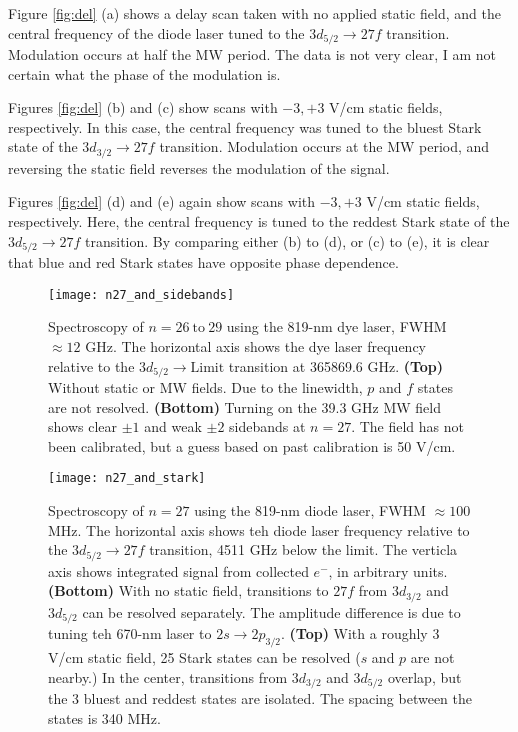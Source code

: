\documentclass{article}
\begin{document}
Figure \ref{fig:del} (a) shows a delay scan taken with no applied static field, and the central frequency of the diode laser tuned to the $3d_{5/2} \rightarrow 27f$ transition. Modulation occurs at half the MW period. The data is not very clear, I am not certain what the phase of the modulation is.

Figures \ref{fig:del} (b) and (c) show scans with $-3, +3$ V/cm static fields, respectively. In this case, the central frequency was tuned to the bluest Stark state of the $3d_{3/2} \rightarrow 27f$ transition. Modulation occurs at the MW period, and reversing the static field reverses the modulation of the signal.

Figures \ref{fig:del} (d) and (e) again show scans with $-3, +3$ V/cm static fields, respectively. Here, the central frequency is tuned to the reddest Stark state of the $3d_{5/2} \rightarrow 27f$ transition. By comparing either (b) to (d), or (c) to (e), it is clear that blue and red Stark states have opposite phase dependence.

\pagebreak

\begin{figure}
	\texttt{[image: n27\_and\_sidebands]}
	\caption{Spectroscopy of $n=26~\textrm{to}~29$ using the 819-nm dye laser, FWHM $\approx 12$ GHz. The horizontal axis shows the dye laser frequency relative to the $3d_{5/2} \rightarrow \textrm{Limit}$ transition at 365869.6 GHz.
	\textbf{(Top)} Without static or MW fields. Due to the linewidth, $p$ and $f$ states are not resolved.
	\textbf{(Bottom)} Turning on the 39.3 GHz MW field shows clear $\pm 1$ and weak $\pm 2$ sidebands at $n=27$. The field has not been calibrated, but a guess based on past calibration is 50 V/cm.}
	\label{fig:n27mw}
\end{figure}


\begin{figure}
	\texttt{[image: n27\_and\_stark]}
	\caption{Spectroscopy of $n=27$ using the 819-nm diode laser, FWHM $\approx 100$ MHz. The horizontal axis shows teh diode laser frequency relative to the $3d_{5/2} \rightarrow 27f$ transition, 4511 GHz below the limit. The verticla axis shows integrated signal from collected $e^-$, in arbitrary units.
	\textbf{(Bottom)} With no static field, transitions to $27f$ from $3d_{3/2}$ and $3d_{5/2}$ can be resolved separately. The amplitude difference is due to tuning teh 670-nm laser to $2s \rightarrow 2p_{3/2}$.
	\textbf{(Top)} With a roughly 3 V/cm static field, 25 Stark states can be resolved ($s$ and $p$ are not nearby.) In the center, transitions from $3d_{3/2}$ and $3d_{5/2}$ overlap, but the 3 bluest and reddest states are isolated. The spacing between the states is 340 MHz.}
	\label{fig:n27s}
\end{figure}
\end{document}
